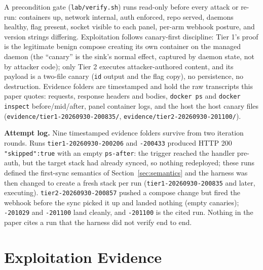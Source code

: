 \documentclass[journal]{IEEEtran}
\begin{document}
A precondition gate (\texttt{lab/verify.sh}) runs read-only before every
attack or re-run: containers up, network internal, auth enforced, repo
served, daemons healthy, flag present, socket visible to each panel, per-arm
webhook posture, and version strings differing. Exploitation follows
canary-first discipline: Tier 1's proof is the legitimate benign compose
creating its own container on the managed daemon (the ``canary'' is the sink's
normal effect, captured by daemon state, not by attacker code); only Tier 2
executes attacker-authored content, and its payload is a two-file canary
(\texttt{id} output and the flag copy), no persistence, no destruction.
Evidence folders are timestamped and hold the raw transcripts this paper
quotes: requests, response headers and bodies, \texttt{docker ps} and
\texttt{docker inspect} before/mid/after, panel container logs, and the host
the host canary files (\texttt{evidence/}\allowbreak\texttt{tier1-20260930-}\allowbreak\texttt{200835/},
\texttt{evidence/}\allowbreak\texttt{tier2-20260930-}\allowbreak\texttt{201100/}).

\textbf{Attempt log.} Nine timestamped evidence folders
survive from two iteration rounds. Runs \texttt{tier1-}\allowbreak\texttt{20260930-200206}
and \texttt{-200433} produced HTTP 200 \texttt{"skipped":true} with an empty
\texttt{ps-after}: the trigger reached the handler pre-auth, but the target
stack had already synced, so nothing redeployed; these runs defined the
first-sync semantics of Section~\ref{sec:semantics} and the harness was then
changed to create a fresh stack per run (\texttt{tier1-}\allowbreak\texttt{20260930-200835}
and later, executing). \texttt{tier2-20260930-200857} pushed a compose change
but fired the webhook before the sync picked it up and landed nothing
(empty canaries); \texttt{-201029} and \texttt{-201100} land cleanly, and
\texttt{-201100} is the cited run. Nothing in the paper cites a run that the
harness did not verify end to end.

\section{Exploitation Evidence}
\label{sec:exploit}
\end{document}
